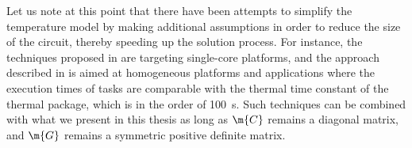 Let us note at this point that there have been attempts to simplify the
temperature model by making additional assumptions in order to reduce the size
of the circuit, thereby speeding up the solution process. For instance, the
techniques proposed in \cite{bao2010, rai2011} are targeting single-core
platforms, and the approach described in \cite{rao2009} is aimed at homogeneous
platforms and applications where the execution times of tasks are comparable
with the thermal time constant of the thermal package, which is in the order of
100~s. Such techniques can be combined with what we present in this thesis as
long as $\m{C}$ remains a diagonal matrix, and $\m{G}$ remains a symmetric
positive definite matrix.
